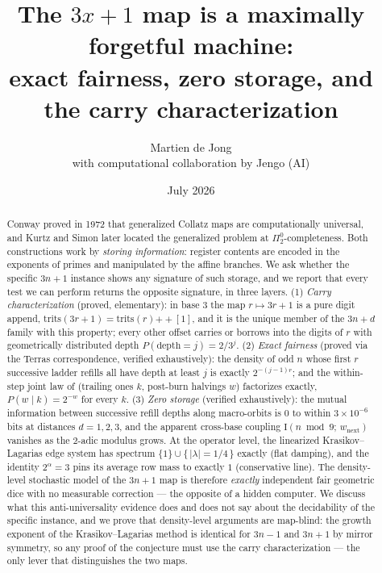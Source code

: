 \documentclass[11pt]{article}
\title{The $3x+1$ map is a maximally forgetful machine:\\
exact fairness, zero storage, and the carry characterization}
\author{Martien de Jong\\[2pt]
\small with computational collaboration by Jengo (AI)}
\date{July 2026}
\theoremstyle{definition}
\newcommand{\Info}{\mathrm{I}}
\begin{document}
\maketitle

\begin{abstract}
Conway proved in 1972 that generalized Collatz maps are computationally universal, and
Kurtz and Simon later located the generalized problem at $\Pi^0_2$-completeness. Both
constructions work by \emph{storing information}: register contents are encoded in the
exponents of primes and manipulated by the affine branches. We ask whether the specific
$3n+1$ instance shows any signature of such storage, and we report that every test we
can perform returns the opposite signature, in three layers. (1) \emph{Carry
characterization} (proved, elementary): in base $3$ the map $r \mapsto 3r+1$ is a pure
digit append, $\mathrm{trits}(3r+1) = \mathrm{trits}(r) \mathbin{+\!\!+} [1]$, and it is
the unique member of the $3n+d$ family with this property; every other offset carries or
borrows into the digits of $r$ with geometrically distributed depth
$P(\mathrm{depth}=j) = 2/3^j$. (2) \emph{Exact fairness} (proved via the Terras
correspondence, verified exhaustively): the density of odd $n$ whose first $r$
successive ladder refills all have depth at least $j$ is exactly $2^{-(j-1)r}$; and the
within-step joint law of (trailing ones $k$, post-burn halvings $w$) factorizes exactly,
$P(w \mid k) = 2^{-w}$ for every $k$. (3) \emph{Zero storage} (verified exhaustively):
the mutual information between successive refill depths along macro-orbits is
$0$ to within $3 \times 10^{-6}$ bits at distances $d = 1,2,3$, and the apparent
cross-base coupling $\Info(n \bmod 9;\, w_{\mathrm{next}})$ vanishes as the $2$-adic
modulus grows. At the operator level, the linearized Krasikov--Lagarias edge system has
spectrum $\{1\} \cup \{\,|\lambda| = 1/4\,\}$ exactly (flat damping), and the identity
$2^\alpha = 3$ pins its average row mass to exactly $1$ (conservative line). The
density-level stochastic model of the $3n+1$ map is therefore \emph{exactly} independent
fair geometric dice with no measurable correction --- the opposite of a hidden computer.
We discuss what this anti-universality evidence does and does not say about the
decidability of the specific instance, and we prove that density-level arguments are
map-blind: the growth exponent of the Krasikov--Lagarias method is identical for $3n-1$
and $3n+1$ by mirror symmetry, so any proof of the conjecture must use the carry
characterization --- the only lever that distinguishes the two maps.
\end{abstract}
\end{document}
